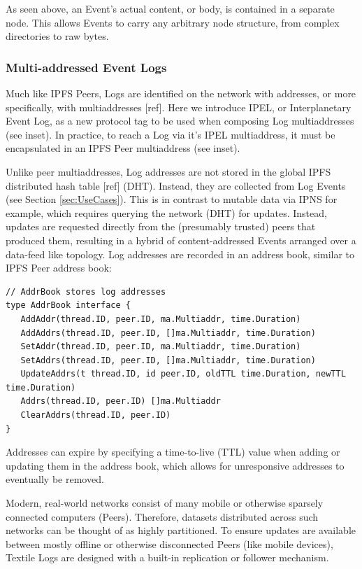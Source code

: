 \documentclass{comjnl}
\begin{document}
As seen above, an Event’s actual content, or body, is contained in a separate node. This allows Events to carry any arbitrary node structure, from complex directories to raw bytes.

\subsubsection{Multi-addressed Event Logs}

Much like IPFS Peers, Logs are identified on the network with addresses, or more specifically, with multiaddresses [ref]. Here we introduce IPEL, or Interplanetary Event Log, as a new protocol tag to be used when composing Log multiaddresses (see inset). In practice, to reach a Log via it’s IPEL multiaddress, it must be encapsulated in an IPFS Peer multiaddress (see inset).

Unlike peer multiaddresses, Log addresses are not stored in the global IPFS distributed hash table [ref] (DHT). Instead, they are collected from Log Events (see Section  \ref{sec:UseCases}). This is in contrast to mutable data via IPNS for example, which requires querying the network (DHT) for updates. Instead, updates are requested directly from the (presumably trusted) peers that produced them, resulting in a hybrid of content-addressed Events arranged over a data-feed like topology. Log addresses are recorded in an address book, similar to IPFS Peer address book:

\begin{lstlisting}
// AddrBook stores log addresses
type AddrBook interface {
   AddAddr(thread.ID, peer.ID, ma.Multiaddr, time.Duration)
   AddAddrs(thread.ID, peer.ID, []ma.Multiaddr, time.Duration)
   SetAddr(thread.ID, peer.ID, ma.Multiaddr, time.Duration)
   SetAddrs(thread.ID, peer.ID, []ma.Multiaddr, time.Duration)
   UpdateAddrs(t thread.ID, id peer.ID, oldTTL time.Duration, newTTL time.Duration)
   Addrs(thread.ID, peer.ID) []ma.Multiaddr
   ClearAddrs(thread.ID, peer.ID)
}
\end{lstlisting}

Addresses can expire by specifying a time-to-live (TTL) value when adding or updating them in the address book, which allows for unresponsive addresses to eventually be removed.

Modern, real-world networks consist of many mobile or otherwise sparsely connected computers (Peers). Therefore, datasets distributed across such networks can be thought of as highly partitioned. To ensure updates are available between mostly offline or otherwise disconnected Peers (like mobile devices), Textile Logs are designed with a built-in replication or follower mechanism.
\end{document}
